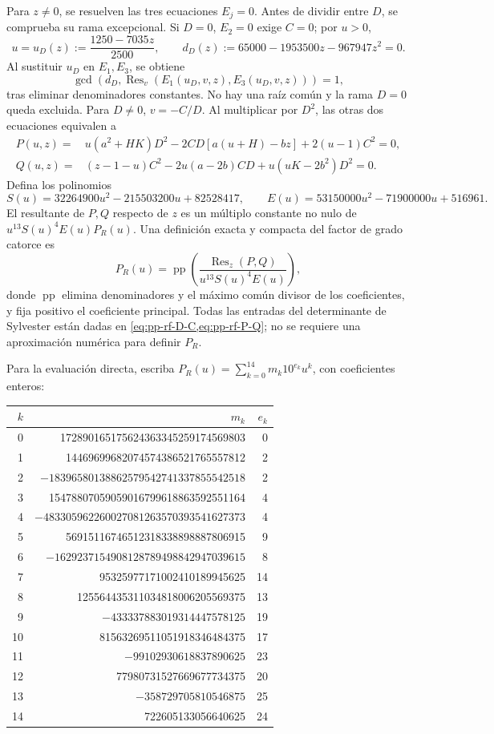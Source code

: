 Para \(z\ne0\), se resuelven las tres ecuaciones \(E_j=0\).
Antes de dividir entre \(D\), se comprueba su rama excepcional. Si
\(D=0\), \(E_2=0\) exige \(C=0\); por \(u>0\),
\[
 u=u_D(z):=\frac{1250-7035z}{2500},\qquad
 d_D(z):=65000-1953500z-967947z^2=0.
\]
Al sustituir \(u_D\) en \(E_1,E_3\), se obtiene
\[
 \gcd\!\left(d_D,
 \operatorname{Res}_v(E_1(u_D,v,z),E_3(u_D,v,z))\right)=1,
\]
tras eliminar denominadores constantes. No hay una raíz común y la rama
\(D=0\) queda excluida. Para \(D\ne0\), \(v=-C/D\). Al multiplicar
por \(D^2\), las otras dos ecuaciones equivalen a
\begin{align}
 P(u,z)={}&u(a^2+HK)D^2-2CD[a(u+H)-bz]+2(u-1)C^2=0,\nonumber\\
 Q(u,z)={}&(z-1-u)C^2-2u(a-2b)CD+u(uK-2b^2)D^2=0.
 \label{eq:pp-rf-P-Q}
\end{align}
Defina los polinomios
\[
 S(u)=32264900u^2-215503200u+82528417,\qquad
 E(u)=53150000u^2-71900000u+516961.
\]
El resultante de \(P,Q\) respecto de \(z\) es un múltiplo constante
no nulo de \(u^{13}S(u)^4E(u)P_R(u)\). Una definición exacta y compacta
del factor de grado catorce es
\begin{equation}
 P_R(u)=\operatorname{pp}\!\left(
 \frac{\operatorname{Res}_z(P,Q)}{u^{13}S(u)^4E(u)}\right),
 \label{eq:pp-rf-eliminant}
\end{equation}
donde \(\operatorname{pp}\) elimina denominadores y el máximo común divisor
de los coeficientes, y fija positivo el coeficiente principal. Todas las
entradas del determinante de Sylvester están dadas en
\cref{eq:pp-rf-D-C,eq:pp-rf-P-Q}; no se requiere una aproximación numérica
para definir \(P_R\).

Para la evaluación directa, escriba
\(P_R(u)=\sum_{k=0}^{14}m_k10^{e_k}u^k\), con coeficientes enteros:
\begin{center}
\small
\begin{tabular}{@{}rrr@{}}
\toprule
\(k\)&\(m_k\)&\(e_k\)\\\midrule
0&172890165175624363345259174569803&0\\
1&14469699682074574386521765557812&2\\
2&\(-18396580138862579542741337855542518\)&2\\
3&15478807059059016799618863592551164&4\\
4&\(-483305962260027081263570393541627373\)&4\\
5&56915116746512318338898887806915&9\\
6&\(-1629237154908128789498842947039615\)&8\\
7&95325977171002410189945625&14\\
8&125564435311034818006205569375&13\\
9&\(-433337883019314447578125\)&19\\
10&81563269511051918346484375&17\\
11&\(-99102930618837890625\)&23\\
12&77980731527669677734375&20\\
13&\(-358729705810546875\)&25\\
14&722605133056640625&24\\\bottomrule
\end{tabular}
\end{center}

